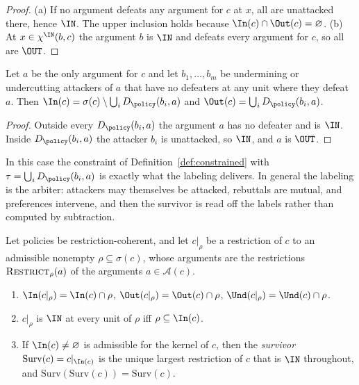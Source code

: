 \begin{proof}
(a) If no argument defeats any argument for $c$ at $x$, all are unattacked there, hence $\IN$. The upper inclusion holds because $\In(c)\cap\Out(c)=\varnothing$. (b) At $x\in\chi^{\IN}(b,c)$ the argument $b$ is $\IN$ and defeats every argument for $c$, so all are $\OUT$.
\end{proof}

\begin{proposition}\label{prop:static}
Let $a$ be the only argument for $c$ and let $b_1,\dots,b_m$ be undermining or undercutting attackers of $a$ that have no defeaters at any unit where they defeat $a$. Then $\In(c)=\sigma(c)\setminus\bigcup_iD_\policy(b_i,a)$ and $\Out(c)=\bigcup_iD_\policy(b_i,a)$.
\end{proposition}

\begin{proof}
Outside every $D_\policy(b_i,a)$ the argument $a$ has no defeater and is $\IN$. Inside $D_\policy(b_i,a)$ the attacker $b_i$ is unattacked, so $\IN$, and $a$ is $\OUT$.
\end{proof}

In this case the constraint of Definition~\ref{def:constrained} with $\tau=\bigcup_iD_\policy(b_i,a)$ is exactly what the labeling delivers. In general the labeling is the arbiter: attackers may themselves be attacked, rebuttals are mutual, and preferences intervene, and then the survivor is read off the labels rather than computed by subtraction.

\begin{theorem}\label{thm:survivor}
Let policies be restriction-coherent, and let $c|_\rho$ be a restriction of $c$ to an admissible nonempty $\rho\subseteq\sigma(c)$, whose arguments are the restrictions $\textsc{Restrict}_\rho(a)$ of the arguments $a\in\mathcal A(c)$.
\begin{enumerate}[label=(\alph*)]
\item $\In(c|_\rho)=\In(c)\cap\rho$, $\Out(c|_\rho)=\Out(c)\cap\rho$, $\Und(c|_\rho)=\Und(c)\cap\rho$.
\item $c|_\rho$ is $\IN$ at every unit of $\rho$ iff $\rho\subseteq\In(c)$.
\item If $\In(c)\ne\varnothing$ is admissible for the kernel of $c$, then the \emph{survivor} $\mathrm{Surv}(c)=c|_{\In(c)}$ is the unique largest restriction of $c$ that is $\IN$ throughout, and $\mathrm{Surv}(\mathrm{Surv}(c))=\mathrm{Surv}(c)$.
\end{enumerate}
\end{theorem}

